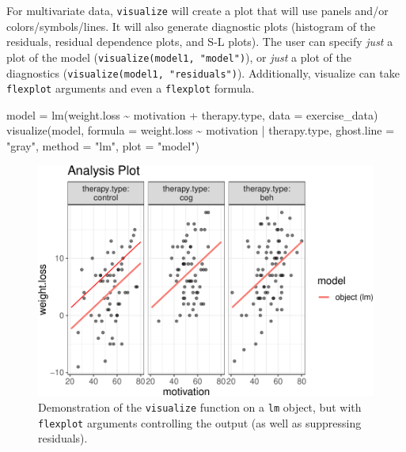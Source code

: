 \documentclass[
  english,
  man]{apa6}
\newenvironment{Shaded}{\begin{snugshade}}{\end{snugshade}}
\newcommand{\AttributeTok}[1]{\textcolor[rgb]{0.77,0.63,0.00}{#1}}
\newcommand{\FunctionTok}[1]{\textcolor[rgb]{0.00,0.00,0.00}{#1}}
\newcommand{\NormalTok}[1]{#1}
\newcommand{\OtherTok}[1]{\textcolor[rgb]{0.56,0.35,0.01}{#1}}
\newcommand{\SpecialCharTok}[1]{\textcolor[rgb]{0.00,0.00,0.00}{#1}}
\newcommand{\StringTok}[1]{\textcolor[rgb]{0.31,0.60,0.02}{#1}}
\begin{document}
\normalsize

For multivariate data, \texttt{visualize} will create a plot that will use panels and/or colors/symbols/lines. It will also generate diagnostic plots (histogram of the residuals, residual dependence plots, and S-L plots). The user can specify \emph{just} a plot of the model (\texttt{visualize(model1,\ "model")}), or \emph{just} a plot of the diagnostics (\texttt{visualize(model1,\ "residuals")}). Additionally, visualize can take \texttt{flexplot} arguments and even a \texttt{flexplot} formula.

\small

\begin{Shaded}
\begin{Highlighting}[]
\NormalTok{model }\OtherTok{=} \FunctionTok{lm}\NormalTok{(weight.loss }\SpecialCharTok{\textasciitilde{}}\NormalTok{ motivation }\SpecialCharTok{+}\NormalTok{ therapy.type, }\AttributeTok{data =}\NormalTok{ exercise\_data)}
\FunctionTok{visualize}\NormalTok{(model, }\AttributeTok{formula =}\NormalTok{ weight.loss }\SpecialCharTok{\textasciitilde{}}\NormalTok{ motivation }\SpecialCharTok{|}\NormalTok{ therapy.type, }
          \AttributeTok{ghost.line =} \StringTok{"gray"}\NormalTok{, }\AttributeTok{method =} \StringTok{"lm"}\NormalTok{, }\AttributeTok{plot =} \StringTok{"model"}\NormalTok{)}
\end{Highlighting}
\end{Shaded}

\begin{figure}
\centering
\includegraphics{flexplot_psychmeth_files/figure-latex/ancova2-1.pdf}
\caption{\label{fig:ancova2}Demonstration of the \texttt{visualize} function on a \texttt{lm} object, but with \texttt{flexplot} arguments controlling the output (as well as suppressing residuals). \label{fig:ancova2}}
\end{figure}
\end{document}
